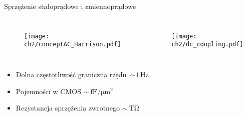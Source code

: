


\begin{frame}{Sprzężenie stałoprądowe i zmiennoprądowe}

    \begin{columns}
        \vspace{-2em} %

        \begin{figure}[H]
            \centering
            \texttt{[image: ch2/conceptAC\_Harrison.pdf]} 
        \end{figure}
        


        \begin{figure}[H]
            \centering
            \texttt{[image: ch2/dc\_coupling.pdf]}
        \end{figure}
    \end{columns}

    \begin{columns}


    {\renewcommand\normalsize{\small}%
    \normalsize

    \vspace{-1em} %
    \begin{alertblock}{}

        \begin{itemize}
            \item Dolna częstotliwość graniczna rzędu~$\SI{\sim 1}{\hertz}$ 
            \item Pojemności w CMOS $\sim\SI{}{\femto\farad\per\micro\metre\squared}$
            \item Rezystancja sprzężenia zwrotnego  $\sim\SI{}{\tera\ohm}$
        \end{itemize}
    \end{alertblock}
    \vspace{-1em} %

}
\end{columns}
\end{frame}
